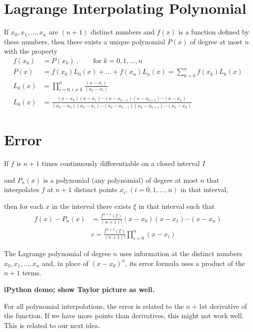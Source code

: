 \documentclass[12pt]{article}
\begin{document}
\section{Lagrange Interpolating Polynomial}
If $x_0, x_1,\dots, x_n$ are $(n+1)$ distinct numbers and $f(x)$ is a function defined by these numbers, then there exists a unique polynomial $P(x)$ of degree at most $n$ with the property
%
\begin{align}
f(x_k) &= P(x_k)\:, \qquad \text{for }k= 0, 1, \dots, n \\
%
P(x) &= f(x_0)L_0(x) + \dots + f(x_n)L_n(x) = \sum_{k=0}^{n}f(x_k)L_k(x) \\
%
L_k(x) &= \prod_{i=0, i \neq k}^n \frac{(x-x_i)}{(x_k-x_i)}\\
%
L_k(x) &= \frac{(x-x_0)(x-x_1)\cdots(x-x_{k-1})(x-x_{k+1})\cdots(x-x_n)}{(x_k-x_0)(x_k-x_1)\cdots(x_k-x_{k-1})(x_k-x_{k+1})\cdots(x_k-x_n)}
\end{align}

\section{Error}
If $f$ is $n+1$ times continuously differentiable on a closed interval $I$

and $P_{n}(x)$ is a polynomial (any polynomial) of degree at most $n$ that interpolates $f$ at $n + 1$ distinct points ${x_i}, (i=0,1,\dots,n)$ in that interval,

then for each $x$ in the interval there exists $\xi$  in that interval such that
\begin{align}
f(x) - P_n(x)& = \frac{f^{n+1}(\xi)}{(n+1)!}(x-x_0)(x-x_1)\cdots(x-x_n) \\
&\boxed{e = \frac{f^{n+1}(\xi)}{(n+1)!}\prod_{i=0}^n (x-x_i)}
\end{align}

The Lagrange polynomial of degree $n$ uses information at the
distinct numbers $x_0, x_1,\dots, x_n$ and, in place of $(x-x_0)^n$, its error formula uses a product of the $n+1$ terms.

\textbf{iPython demo; show Taylor picture as well.}

For all polynomial interpolations, the error is related to the $n+1$st derivative of the function. If we have more points than derivatives, this might not work well. This is related to our next idea.
\end{document}
